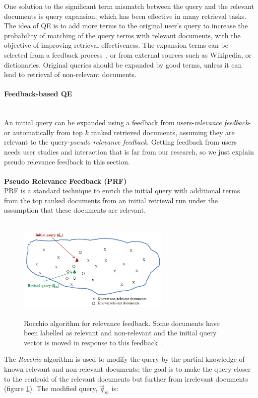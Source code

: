 One solution to the significant term mismatch between the query and the relevant documents is query expansion, which has been effective in many retrieval tasks. The idea of QE is to add more terms to the original user's query to increase the probability of matching of the query terms with relevant documents, with the objective of improving retrieval effectiveness. The expansion terms can be selected from a feedback process~\citep{cao2008selecting}, or from external sources such as Wikipedia, or dictionaries. Original queries should be expanded by good terms, unless it can lead to retrieval of non-relevant documents.
\paragraph{Feedback-based QE}
\ \\
An initial query can be expanded using a feedback from users-\textit{relevance feedback}-or automatically from top $ k $ ranked retrieved documents, assuming they are relevant to the query-\textit{pseudo relevance feedback}. Getting feedback from  users needs user studies and interaction that is far from our research, so we just explain pseudo relevance feedback in this section. \\\\
\textbf{Pseudo Relevance Feedback (PRF)} 
\ \\
PRF is a standard technique to enrich the initial query with additional terms from the top ranked documents from an initial retrieval run under the assumption that these documents are relevant.
\begin{figure}[htpb]
   \centering
   \includegraphics[width=0.65\textwidth,height=50mm]{figs/rocchio.jpg}
   \caption{Rocchio algorithm for relevance feedback. Some documents have been labelled as relevant and non-relevant and the initial query vector is moved in response to this feedback~\citep{manning2008introduction}.}  
   \label{fig:rocchio} 
\end{figure}
\FloatBarrier 
\noindent
The \textit{Rocchio} algorithm is used to modify the query by the partial knowledge of known relevant and non-relevant documents; the goal is to make the query closer to the centroid of the relevant documents but further from irrelevant documents (figure \ref{fig:rocchio}). The modified query, $ \vec{q}_m $ is:
